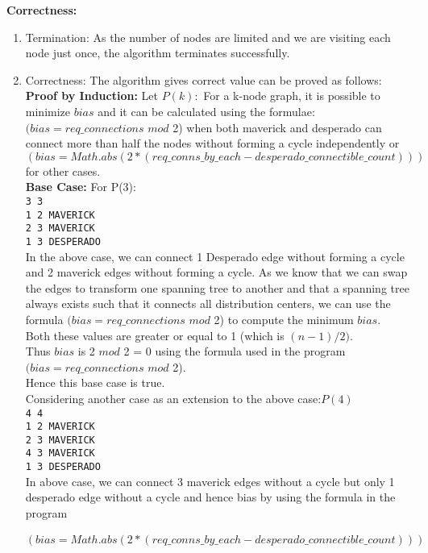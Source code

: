 \documentclass[12pt]{article}
\begin{document}
\begin{enumerate}
\textbf{Correctness:}
\begin{enumerate}
	\item Termination: As the number of nodes are limited and we are visiting each node just once, the algorithm terminates successfully.
	\item Correctness: The algorithm gives correct value can be proved as follows:\\
\textbf{Proof by Induction:} Let $P(k):$ For a k-node graph, it is possible to minimize $bias$ and it can be calculated using the formulae: $(bias = req\_connections$ $mod$ 2) when both maverick and desperado can connect more than half the nodes without forming a cycle independently or $(bias = Math.abs(2 * (req\_conns\_by\_each - desperado\_connectible\_count))) $ for other cases.\\
\textbf{Base Case:} For P(3):\\
\texttt{3 3\\
1 2 MAVERICK\\
2 3 MAVERICK\\
1 3 DESPERADO\\}
In the above case, we can connect 1 Desperado edge without forming a cycle and 2 maverick edges without forming a cycle. As we know that we can swap the edges to transform one spanning tree to another and that a spanning tree always exists such that it connects all distribution centers, we can use the formula $(bias = req\_connections$ $mod$ 2) to compute the minimum $bias.$\\
Both these values are greater or equal to 1 (which is $(n - 1) / 2)$. \\
Thus $bias$ is 2 $mod$ 2 = 0 using the formula used in the program $(bias = req\_connections$ $mod$ 2).\\
Hence this base case is true.\\
Considering another case as an extension to the above case:$P(4)$\\
\texttt{4 4\\
1 2 MAVERICK\\
2 3 MAVERICK\\
4 3 MAVERICK\\
1 3 DESPERADO\\}
In above case, we can connect 3 maverick edges without a cycle but only 1 desperado edge without a cycle and hence bias by using the formula in the program \\
\verb|			|$(bias = Math.abs(2 * (req\_conns\_by\_each - desperado\_connectible\_count))) $\\

\end{enumerate}
\end{enumerate}
\end{document}
